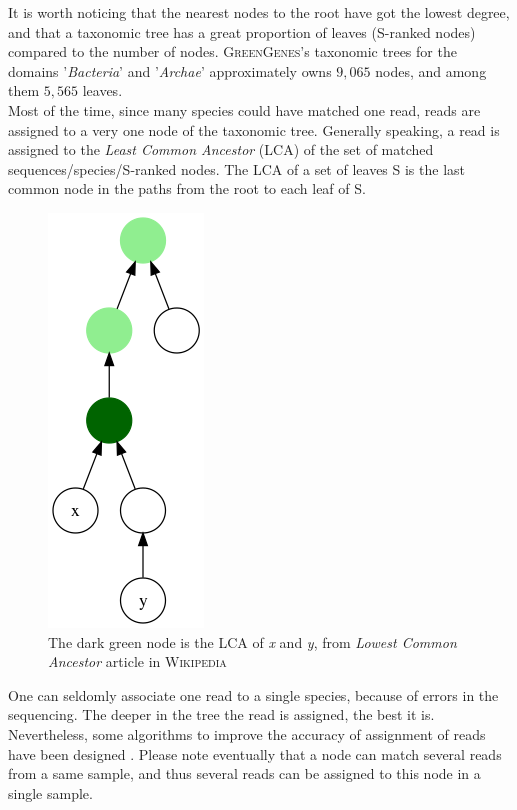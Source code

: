 \documentclass{report}
\begin{document}
It is worth noticing that the nearest nodes to the root have got the lowest degree, and that a taxonomic tree has a great proportion of leaves (S-ranked nodes) compared to the number of nodes. \textsc{GreenGenes}'s taxonomic trees for the domains '\emph{Bacteria}' and '\emph{Archae}' approximately owns $9,065$ nodes, and among them $5,565$ leaves.\\

Most of the time, since many species could have matched one read, reads are assigned to a very one node of the taxonomic tree. Generally speaking, a read is assigned to the \emph{Least Common Ancestor} (\textsc{LCA}) \cite{Tarjan} of the set of matched sequences/species/S-ranked nodes. The \textsc{LCA} of a set of leaves S is the last common node in the paths from the root to each leaf of S.

\begin{figure}[H]
\centering
\includegraphics[scale=0.35]{illustrations/Lowest_common_ancestor.png}
\caption{The dark green node is the LCA of \emph{x} and \emph{y}, from \emph{Lowest Common Ancestor} article in \textsc{Wikipedia}}
\end{figure}

One can seldomly associate one read to a single species, because of errors in the sequencing. The deeper in the tree the read is assigned, the best it is. Nevertheless, some algorithms to improve the accuracy of assignment of reads have been designed \cite{Tango1} \cite{Tango3}. Please note eventually that a node can match several reads from a same sample, and thus several reads can be assigned to this node in a single sample.
\end{document}
